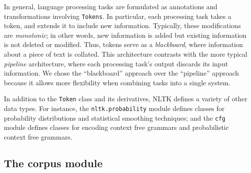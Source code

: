 \documentclass[11pt]{article}
\def\object#1{\texttt{\small #1}}
\begin{document}
In general, language processing tasks are formulated as
annotations and transformations involving \object{Tokens}.  In
particular, each processing task takes a token, and extends it to
include new information.  Typically, these modifications are
\emph{monotonic}; in other words, new information is added but
existing information is not deleted or modified.  Thus, tokens serve
as a \emph{blackboard}, where information about a piece of text is
collated.  This architecture contrasts with the more typical
\emph{pipeline} architecture, where each processing task's output
discards its input information.  We chose the ``blackboard'' approach
over the ``pipeline'' approach because it allows more flexibility when
combining tasks into a single system.

In addition to the \object{Token} class and its derivatives, NLTK
defines a variety of other data types.  For instance, the
\object{nltk.probability} module defines classes for
probability distributions and statistical smoothing techniques; and
the \object{cfg} module defines classes for encoding context free
grammars and probabilistic context free grammars.

\subsection{The corpus module}
\end{document}
